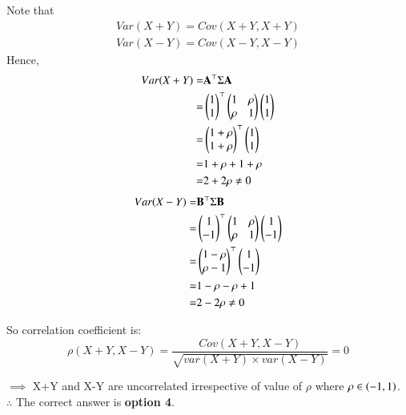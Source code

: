 \documentclass[journal,12pt,twocolumn]{IEEEtran}
\begin{document}
Note that 
\begin{align}
Var(X+Y) = Cov(X+Y , X+Y)\\ 
 Var(X-Y)  = Cov(X-Y , X-Y)
\end{align}
Hence,
\begin{align}
    Var(X+Y) =&\mathbf{A^\top} \Sigma \mathbf{A} \\
        =& \begin{pmatrix}1 \\ 1\end{pmatrix}^\top
         \begin{pmatrix}
            1 & \rho\\
            \rho & 1 
        \end{pmatrix}
        \begin{pmatrix}1 \\ 1\end{pmatrix}\\
    =& \begin{pmatrix}1+\rho \\ 1+\rho\end{pmatrix}^\top
        \begin{pmatrix}1 \\ 1\end{pmatrix}\\
    =& 1+\rho+1+\rho \\
    =& 2+2\rho \neq 0
\end{align}
\begin{align}
    Var(X-Y) =& \mathbf{B^\top} \Sigma \mathbf{B} \\
        =& \begin{pmatrix}1 \\ -1\end{pmatrix}^\top
    \begin{pmatrix}
            1 & \rho\\
            \rho & 1 
        \end{pmatrix}
         \begin{pmatrix}1 \\ -1\end{pmatrix}\\
    =& \begin{pmatrix}1-\rho \\ \rho-1\end{pmatrix}^\top
        \begin{pmatrix}1 \\ -1\end{pmatrix}\\
    =& 1-\rho-\rho+1 \\
    =& 2-2\rho \neq 0
\end{align}

So correlation coefficient is:
\begin{equation}
    \rho(X+Y,X-Y) = \frac{Cov(X+Y,X-Y)}{\sqrt{var(X+Y) \times var(X-Y)}}
    = 0
\end{equation}

$\implies$ X+Y and X-Y are uncorrelated irrespective of value of $\rho$ where $\rho \in \left(-1,1\right)$.\\

$\therefore$ The correct answer is \textbf{option 4}.
\end{document}
